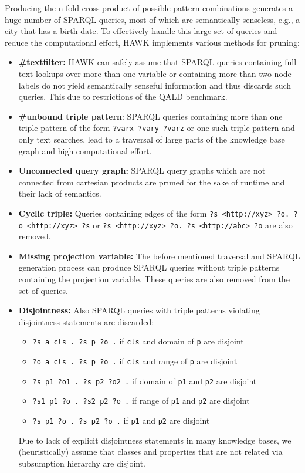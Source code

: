 Producing the n-fold-cross-product of possible pattern combinations generates a huge number of SPARQL queries, most of which are semantically senseless, e.g., a city that has a birth date. 
To effectively handle this large set of queries and reduce the computational effort, HAWK implements various methods for pruning:
\begin{itemize}
\item \textbf{\#textfilter: } HAWK can safely assume that SPARQL queries containing full-text lookups over more than one variable or containing more than two node labels do not yield semantically senseful information and thus discards such queries.  This due to restrictions of the \ac{QALD} benchmark.
\item \textbf{\#unbound triple pattern}: SPARQL queries containing more than one triple pattern of the form \texttt{?varx ?vary ?varz} or one such triple pattern and only text searches, lead to a traversal of large parts of the knowledge base graph and high computational effort.
\item \textbf{Unconnected query graph: } SPARQL query graphs which are not connected from cartesian products are pruned for the sake of runtime and their lack of semantics.
\item \textbf{Cyclic triple: } Queries containing edges of the form \texttt{?s <http://xyz>  ?o. ?o <http://xyz> ?s} or \texttt{?s <http://xyz>  ?o. ?s <http://abc> ?o} are also removed. 
\item \textbf{Missing projection variable: } The before mentioned traversal and SPARQL generation process can produce SPARQL queries without triple patterns containing the projection variable. These queries are also removed from the set of queries.
\item \textbf{Disjointness: }
Also SPARQL queries with triple patterns violating disjointness statements are discarded:
\begin{itemize}
\item \texttt{?s a  cls . ?s p ?o .} if \texttt{cls} and domain of \texttt{p} are disjoint
\item \texttt{?o a  cls . ?s p ?o .} if \texttt{cls} and range of \texttt{p} are disjoint
\item \texttt{?s p1  ?o1 . ?s p2 ?o2 .} if domain of \texttt{p1} and \texttt{p2} are disjoint
\item \texttt{?s1 p1  ?o . ?s2 p2 ?o .} if range of \texttt{p1} and \texttt{p2} are disjoint
\item \texttt{?s p1  ?o . ?s p2 ?o .} if \texttt{p1} and \texttt{p2} are disjoint
\end{itemize}
Due to lack of explicit disjointness statements in many knowledge bases, we (heuristically) assume that classes and properties that are not related via subsumption hierarchy are disjoint.
\end{itemize}

